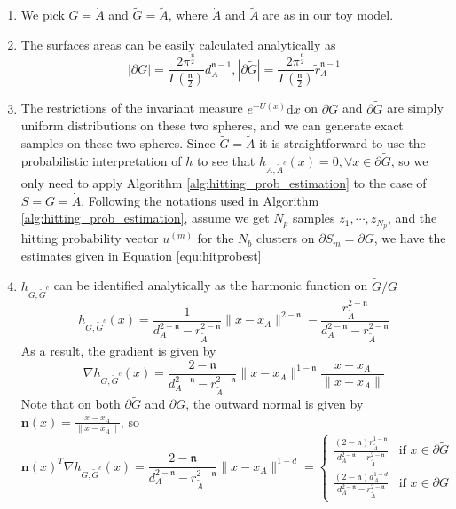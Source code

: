 \documentclass[english, aip, jcp, priprint, graphicx,floatfix]{revtex4-1}
\theoremstyle{plain}
\theoremstyle{definition}
\theoremstyle{plain}
\newcommand{\dimension}{{\mathfrak{n}}}
\begin{document}
\begin{enumerate}
	\item We pick $G = \dot{A}$ and $\tilde{G} = \tilde{A}$, where $\dot{A}$ and $\tilde{A}$ are as in our toy model.
	\item The surfaces areas can be easily calculated analytically as
\[|\partial G| = \frac{2\pi^{\frac{\dimension}{2}}}{\Gamma(\frac{\dimension}{2})}d_A^{\dimension - 1}, |\partial \tilde{G}| = \frac{2\pi^{\frac{\dimension}{2}}}{\Gamma(\frac{\dimension}{2})}\tilde{r}_A^{\dimension - 1}\]
	\item The restrictions of the invariant measure $e^{- U (x)} \mathrm{d} x$ on $\partial G$ and $\partial \tilde{G}$ are simply uniform distributions on these two spheres, and we can generate exact samples on these two spheres. Since $\tilde{G} = \tilde{A}$ it is straightforward to use the probabilistic interpretation of $h$ to see that $h_{A, \tilde{A}^c} (x) = 0, \forall x \in \partial \tilde{G}$, so we only need to apply Algorithm \ref{alg:hitting_prob_estimation} to the case of $S=G=\dot{A}$. Following the notations used in Algorithm \ref{alg:hitting_prob_estimation}, assume we get $N_p$ samples $z_1,\cdots, z_{N_p}$, and the hitting probability vector $u^{(m)}$ for the $N_b$ clusters on $\partial S_m = \partial G$, we have the estimates given in Equation \ref{equ:hitprobest}
	\item $h_{G, \tilde{G}^c}$ can be identified analytically as the harmonic function on $\tilde{G} / G$\cite{Wendel1980-sj}
\[ h_{G, \tilde{G}^c} (x) = \frac{1}{d_A^{2 - \dimension} - r_{\tilde{A}}^{2 - \dimension}} \| x
- x_A \|^{2 - \dimension} - \frac{r_{\tilde{A}}^{2 - \dimension}}{d_A^{2 - \dimension} -
r_{\tilde{A}}^{2 - \dimension}} \]
As a result, the gradient is given by
\[ \nabla h_{G, \tilde{G}^c} (x) = \frac{2 - \dimension}{d_A^{2 - \dimension} - r_{\tilde{A}}^{2
   - \dimension}} \| x - x_A \|^{1 - \dimension} \frac{x - x_A}{\| x - x_A \|} \]
Note that on both $\partial \tilde{G}$ and $\partial G$, the outward normal is
given by ${\textbf{n}} (x) = \frac{x - x_A}{\| x - x_A \|}$, so
\[
	{\textbf{n}} (x)^T \nabla h_{G, \tilde{G}^c} (x) = \frac{2 - \dimension}{d_A^{2 - \dimension} - r_{\tilde{A}}^{2 - \dimension}} \| x - x_A \|^{1 - d} = 
\begin{cases}
	\frac{(2 - \dimension) r_{\tilde{A}}^{1 - \dimension}}{d_A^{2 - \dimension} - r_{\tilde{A}}^{2 - \dimension}} & \text{if }x \in \partial \tilde{G}\\
	\frac{(2 - \dimension) d_A^{1 - d}}{d_A^{2 - \dimension} - r_{\tilde{A}}^{2 - \dimension}} & \text{if }x \in \partial G

\end{cases}\]
\end{enumerate}
\end{document}
